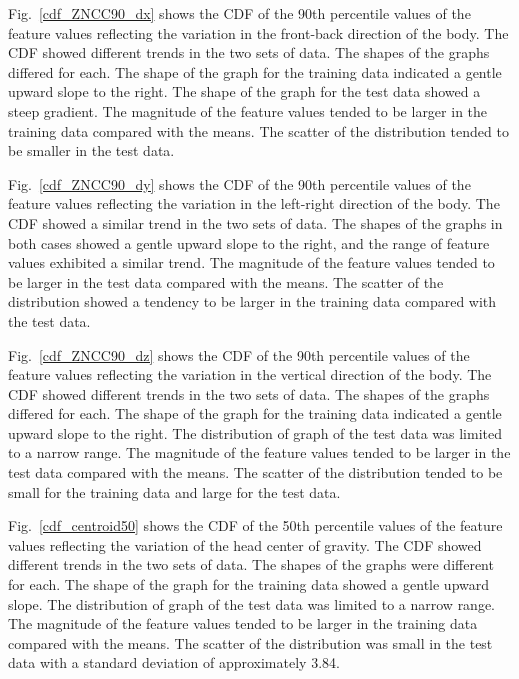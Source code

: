 % 
Fig.~\ref{cdf_ZNCC90_dx} shows the CDF of the 90th percentile values of the feature values reflecting the variation in the front-back direction of the body. 
% 
The CDF showed different trends in the two sets of data. 
% 
The shapes of the graphs differed for each. 
% 
The shape of the graph for the training data indicated a gentle upward slope to the right.
% 
The shape of the graph for the test data showed a steep gradient.
%
The magnitude of the feature values tended to be larger in the training data compared with the means. 
% 
The scatter of the distribution tended to be smaller in the test data.

% 
Fig.~\ref{cdf_ZNCC90_dy} shows the CDF of the 90th percentile values of the feature values reflecting the variation in the left-right direction of the body. 
% 
The CDF showed a similar trend in the two sets of data. 
% 
The shapes of the graphs in both cases showed a gentle upward slope to the right, and the range of feature values exhibited a similar trend.
% 
The magnitude of the feature values tended to be larger in the test data compared with the means. 
% 
The scatter of the distribution showed a tendency to be larger in the training data compared with the test data.

% 
Fig.~\ref{cdf_ZNCC90_dz} shows the CDF of the 90th percentile values of the feature values reflecting the variation in the vertical direction of the body. 
%
The CDF showed different trends in the two sets of data. 
% 
The shapes of the graphs differed for each. 
% 
The shape of the graph for the training data indicated a gentle upward slope to the right.
% 
The distribution of graph of the test data was limited to a narrow range.
% 
The magnitude of the feature values tended to be larger in the test data compared with the means. 
% 
The scatter of the distribution tended to be small for the training data and large for the test data. 

% 
Fig.~\ref{cdf_centroid50} shows the CDF of the 50th percentile values of the feature values reflecting the variation of the head center of gravity. 
%
The CDF showed different trends in the two sets of data. 
% 
The shapes of the graphs were different for each. 
% 
The shape of the graph for the training data showed a gentle upward slope. 
% 
The distribution of graph of the test data was limited to a narrow range.
%
The magnitude of the feature values tended to be larger in the training data compared with the means. 
% 
The scatter of the distribution was small in the test data with a standard deviation of approximately 3.84. 

